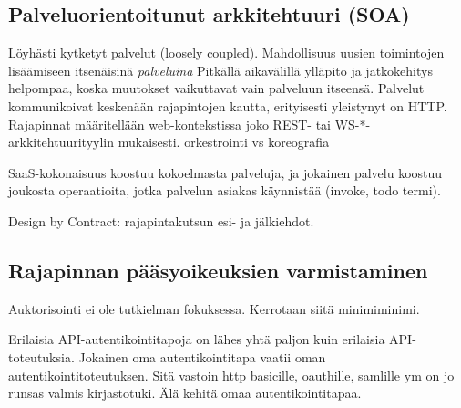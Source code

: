 \documentclass[finnish,gradu]{tktltiki}
\begin{document}





  \subsection{Palveluorientoitunut arkkitehtuuri (SOA)} %
  \label{sub:arkkitehtuurityyli_soa}

  Löyhästi kytketyt palvelut (loosely coupled).
  Mahdollisuus uusien toimintojen lisäämiseen itsenäisinä \emph{palveluina}
  Pitkällä aikavälillä ylläpito ja jatkokehitys helpompaa, koska muutokset vaikuttavat vain palveluun itseensä.
  Palvelut kommunikoivat keskenään rajapintojen kautta, erityisesti yleistynyt on HTTP.
  Rajapinnat määritellään web-kontekstissa joko REST- tai WS-*-arkkitehtuurityylin mukaisesti.
  orkestrointi vs koreografia

  SaaS-kokonaisuus koostuu kokoelmasta palveluja, ja jokainen palvelu koostuu joukosta operaatioita, jotka palvelun asiakas käynnistää (invoke, todo termi).

  Design by Contract: rajapintakutsun esi- ja jälkiehdot.



  \subsection{Rajapinnan pääsyoikeuksien varmistaminen} %
  \label{sub:rajapintakutsun_pääsyoikeudet}

  Auktorisointi ei ole tutkielman fokuksessa. Kerrotaan siitä minimiminimi.

  Erilaisia API-autentikointitapoja on lähes yhtä paljon kuin erilaisia API-toteutuksia. Jokainen oma autentikointitapa vaatii oman autentikointitoteutuksen. Sitä vastoin http basicille, oauthille, samlille ym on jo runsas valmis kirjastotuki.  Älä kehitä omaa autentikointitapaa.
\end{document}
